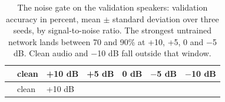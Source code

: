 \documentclass{article}
\begin{document}
\begin{longtable}[]{@{}
  >{\raggedright\arraybackslash}p{}
  >{\raggedright\arraybackslash}p{}
  >{\raggedright\arraybackslash}p{}
  >{\raggedright\arraybackslash}p{}
  >{\raggedright\arraybackslash}p{}
  >{\raggedright\arraybackslash}p{}
  >{\raggedright\arraybackslash}p{}@{}}
\caption{The noise gate on the validation speakers: validation accuracy
in percent, mean \ensuremath{\pm} standard deviation over three seeds,
by signal-to-noise ratio. The strongest untrained network lands between
70 and 90\% at +10, +5, 0 and \ensuremath{-}5 dB. Clean audio and
\ensuremath{-}10 dB fall outside that window.}\tabularnewline
\toprule\noalign{}
\begin{minipage}[b]{\linewidth}\raggedright
\end{minipage} & \begin{minipage}[b]{\linewidth}\raggedright
clean
\end{minipage} & \begin{minipage}[b]{\linewidth}\raggedright
+10 dB
\end{minipage} & \begin{minipage}[b]{\linewidth}\raggedright
+5 dB
\end{minipage} & \begin{minipage}[b]{\linewidth}\raggedright
0 dB
\end{minipage} & \begin{minipage}[b]{\linewidth}\raggedright
\ensuremath{-}5 dB
\end{minipage} & \begin{minipage}[b]{\linewidth}\raggedright
\ensuremath{-}10 dB
\end{minipage} \\
\midrule\noalign{}
\endfirsthead
\toprule\noalign{}
\begin{minipage}[b]{\linewidth}\raggedright
\end{minipage} & \begin{minipage}[b]{\linewidth}\raggedright
clean
\end{minipage} & \begin{minipage}[b]{\linewidth}\raggedright
+10 dB
\end{minipage} & \begin{minipage}[b]{\linewidth}\raggedright

\end{minipage}
\end{longtable}
\end{document}

